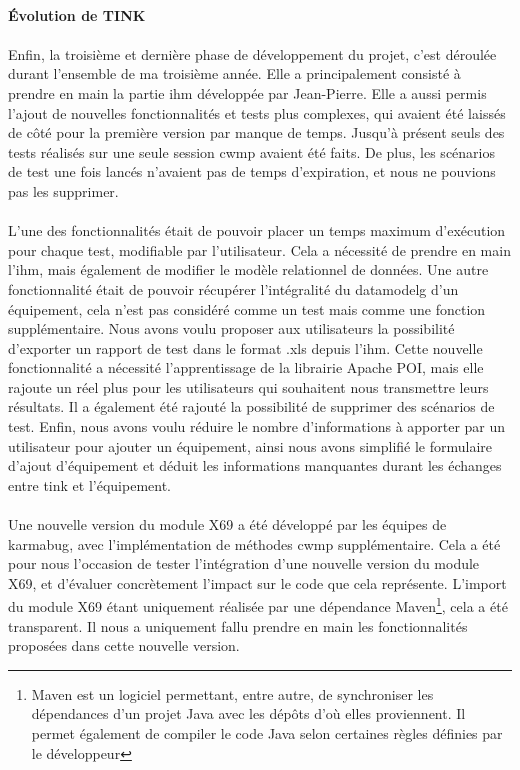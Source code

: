 \documentclass[12pt,a4paper]{report}
\begin{document}
\paragraph{Évolution de TINK}
\paragraph*{}Enfin, la troisième et dernière phase de développement du projet, c'est déroulée durant l'ensemble de ma troisième année. Elle a principalement consisté à prendre en main la partie \gls{ihm} développée par Jean-Pierre. Elle a aussi permis l'ajout de nouvelles fonctionnalités et tests plus complexes, qui avaient été laissés de côté pour la première version par manque de temps. Jusqu'à présent seuls des tests réalisés sur une seule session \gls{cwmp} avaient été faits. De plus, les scénarios de test une fois lancés n'avaient pas de temps d'expiration, et nous ne pouvions pas les supprimer. 
\paragraph*{}L'une des fonctionnalités était de pouvoir placer un temps maximum d'exécution pour chaque test, modifiable par l'utilisateur. Cela a nécessité de prendre en main l'\gls{ihm}, mais également de modifier le modèle relationnel de données. Une autre fonctionnalité était de pouvoir récupérer l'intégralité du \gls{datamodelg} d'un équipement, cela n'est pas considéré comme un test mais comme une fonction supplémentaire. Nous avons voulu proposer aux utilisateurs la possibilité d'exporter un rapport de test dans le format .xls depuis l'\gls{ihm}. Cette nouvelle fonctionnalité a nécessité l'apprentissage de la librairie Apache POI, mais elle rajoute un réel plus pour les utilisateurs qui souhaitent nous transmettre leurs résultats. Il a également été rajouté la possibilité de supprimer des scénarios de test. Enfin, nous avons voulu réduire le nombre d'informations à apporter par un utilisateur pour ajouter un équipement, ainsi nous avons simplifié le formulaire d'ajout d'équipement et déduit les informations manquantes durant les échanges entre \gls{tink} et l'équipement. 
\paragraph*{}Une nouvelle version du module X69 a été développé par les équipes de \gls{karmabug}, avec l'implémentation de méthodes \gls{cwmp} supplémentaire. Cela a été pour nous l'occasion de tester l'intégration d'une nouvelle version du module X69, et d'évaluer concrètement l'impact sur le code que cela représente. L'import du module X69 étant uniquement réalisée par une dépendance Maven\footnote{Maven est un logiciel permettant, entre autre, de synchroniser les dépendances d'un projet Java avec les dépôts d'où elles proviennent. Il permet également de compiler le code Java selon certaines règles définies par le développeur}, cela a été transparent. Il nous a uniquement fallu prendre en main les fonctionnalités proposées dans cette nouvelle version. 
\end{document}
